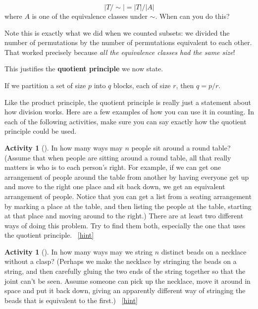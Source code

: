 \documentclass[10pt,]{book}
\newcommand{\terminology}[1]{\textbf{#1}}
\theoremstyle{plain}
\theoremstyle{definition}
\theoremstyle{definition}
\theoremstyle{definition}
\newtheorem{activity}[project]{Activity}
\numberwithin{equation}{chapter}
\begin{document}
\begin{equation*}
|T/\sim| = |T|/|A|
\end{equation*}
where \(A\) is one of the equivalence classes under \(\sim\).  When can you do this?%
\par
\hypertarget{p-315}{}%
Note this is exactly what we did when we counted subsets: we divided the number of permutations by the number of permutations equivalent to each other.  That worked precisely because \emph{all the equivalence classes had the same size}!%
\par
\hypertarget{p-316}{}%
This justifies the \terminology{quotient principle} we now state.%
\begin{assemblage}\label{assemblage-quotientprinciple}
\hypertarget{p-317}{}%
If we partition a set of size \(p\) into \(q\) blocks, each of size \(r\), then \(q = p/r\).%
\end{assemblage}
\hypertarget{p-318}{}%
Like the product principle, the quotient principle is really just a statement about how division works.  Here are a few examples of how you can use it in counting.  In each of the following activities, make sure you can say exactly how the quotient principle could be used.%
\begin{activity}[]\label{roundtable}
\hypertarget{p-319}{}%
In how many ways may \(n\) people sit around a round table? (Assume that when people are sitting around a round table, all that really matters is who is to each person's right. For example, if we can get one arrangement of people around the table from another by having everyone get up and move to the right one place and sit back down, we get an equivalent arrangement of people. Notice that you can get a list from a seating arrangement by marking a place at the table, and then listing the people at the table, starting at that place and moving around to the right.) There are at least two different ways of doing this problem. Try to find them both, especially the one that uses the quotient principle.%
~\hfill{\tiny\hyperlink{a-48}{[hint]}\hypertarget{q-48}{}}\end{activity}
\begin{activity}[]\label{necklace}
\hypertarget{p-323}{}%
In how many ways may we string \(n\) distinct beads on a necklace without a clasp? (Perhaps we make the necklace by stringing the beads on a string, and then carefully gluing the two ends of the string together so that the joint can't be seen. Assume someone can pick up the necklace, move it around in space and put it back down, giving an apparently different way of stringing the beads that is equivalent to the first.)%
~\hfill{\tiny\hyperlink{a-49}{[hint]}\hypertarget{q-49}{}}\end{activity}
\end{document}
